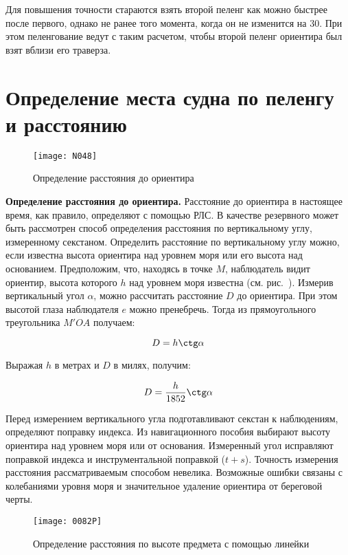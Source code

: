 Для повышения точности стараются взять второй пеленг как можно быстрее
после первого, однако не ранее того момента, когда он не изменится на
30\gr. При этом пеленгование ведут с таким расчетом, чтобы
второй пеленг ориентира был взят вблизи его траверза.

\section{Определение места судна по пеленгу и расстоянию}

\begin{figure}[htb]
  \centering{}
  \texttt{[image: N048]}
  \caption{Определение расстояния до ориентира}
  \label{fig:N48}
\end{figure}

\textbf{Определение расстояния до ориентира.} Расстояние до ориентира
в настоящее время, как правило, определяют с помощью РЛС. В качестве
резервного может быть рассмотрен способ определения расстояния по
вертикальному углу, измеренному секстаном. Определить расстояние по
вертикальному углу можно, если известна высота ориентира над уровнем
моря или его высота над основанием. Предположим, что, находясь в точке
$M$, наблюдатель видит ориентир, высота которого $h$ над уровнем моря
известна (см. рис.~). Измерив вертикальный угол $\alpha$,
можно рассчитать расстояние $D$ до ориентира. При этом высотой глаза
наблюдателя $e$ можно пренебречь. Тогда из прямоугольного треугольника
$M'OA$ получаем:

\begin{equation}
  D = h \ctg \alpha 
\end{equation}

Выражая $h$ в метрах и $D$ в милях, получим: 

\begin{equation}
  D = \frac{h}{1852} \ctg \alpha 
\end{equation}

Перед измерением вертикального угла подготавливают секстан к
наблюдениям, определяют поправку индекса. Из навигационного пособия
выбирают высоту ориентира над уровнем моря или от
основания. Измеренный угол исправляют поправкой индекса и
инструментальной поправкой ($t + s$). Точность измерения расстояния
рассматриваемым способом невелика. Возможные ошибки связаны с
колебаниями уровня моря и значительное удаление ориентира от береговой
черты.

\begin{figure}[htb]
  \centering{}
  \texttt{[image: 0082P]}
  \caption{Определение расстояния по высоте предмета с помощью линейки}
  \label{fig:N48-1}
\end{figure}

